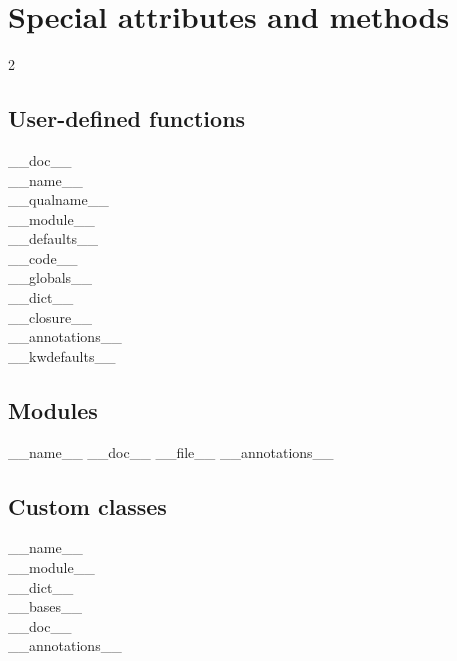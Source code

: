 \documentclass [8pt] {extarticle}
\begin{document}
    \pagebreak

    \section {Special attributes and methods}
    

    \begin {multicols} {2}
    \subsection {User-defined functions}
    \_\_doc\_\_ \\
    \_\_name\_\_ \\
    \_\_qualname\_\_ \\
    \_\_module\_\_ \\
    \_\_defaults\_\_ \\
    \_\_code\_\_ \\
    \_\_globals\_\_ \\
    \_\_dict\_\_ \\
    \_\_closure\_\_ \\
    \_\_annotations\_\_ \\
    \_\_kwdefaults\_\_ \\

    \columnbreak

    \subsection {Modules}
    \_\_name\_\_ \quad
    \_\_doc\_\_ \quad
    \_\_file\_\_ \quad
    \_\_annotations\_\_ \quad

    \subsection {Custom classes}
    \_\_name\_\_ \\
    \_\_module\_\_ \\
    \_\_dict\_\_ \\
    \_\_bases\_\_ \\
    \_\_doc\_\_ \\
    \_\_annotations\_\_ \\
    \end {multicols}
\end{document}
